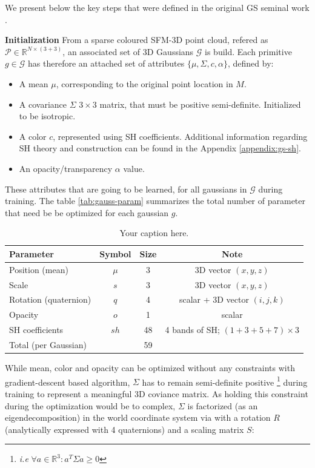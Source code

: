 We present below the key steps that were defined in the original \ac{GS} seminal work \citep{kerbl20233d}.

\noindent \textbf{Initialization} From a sparse coloured \ac{SFM}-3D point cloud, refered as $\mathcal{P}\in\mathbb{R}^{N\times(3+3)}$, an associated set of 3D Gaussians $\mathcal{G}$ is build. Each primitive $g \in \mathcal{G}$ has therefore an attached set of attributes $\{\mu,\Sigma,c,\alpha\}$, defined by: 
\begin{itemize}
    \item A mean $\mu$, corresponding to the original point location in $M$. 
    \item A covariance $\Sigma$ $3\times3$ matrix, that must be positive semi-definite. Initialized to be isotropic. 
    \item A color $c$, represented using \ac{SH} coefficients. Additional information regarding \ac{SH} theory and construction can be found in the Appendix \ref{appendix:gs-sh}. 
    \item An opacity/transparency $\alpha$ value. 
\end{itemize}

These attributes that are going to be learned, for all gaussians in  $\mathcal{G}$ during training. The table \ref{tab:gauss-param} summarizes the total number of parameter that need be be optimized for each gaussian $g$. 


\begin{table}[h!]
  \centering
  \begin{tabular}{lccc}
  \hline
  Parameter & Symbol & Size & Note \\
  \hline
  Position (mean) & $\mu$ & 3 & 3D vector $(x, y, z)$ \\
  Scale & $s$ & 3 & 3D vector $(x, y, z)$ \\
  Rotation (quaternion) & $q$ & 4 & scalar + 3D vector $(i, j, k)$ \\
  Opacity & $o$ & 1 & scalar \\
  SH coefficients & $sh$ & 48 & 4 bands of SH; $(1+3+5+7)\times3$ \\
  \hline
  Total (per Gaussian) & & 59 & \\
  \hline
  \end{tabular}
  \caption{Your caption here.}
  \label{table:your_label}
  \end{table}
  

While mean, color and opacity can be optimized without any constraints with gradient-descent based algorithm, $\Sigma$ has to remain semi-definite positive \footnote{\textit{i.e} $ \forall a \in \mathbb{R}^{3}: a^{T}\Sigma a \geq 0$} during training to represent a meaningful 3D coviance matrix. As holding this constraint during the optimization would be to complex, $\Sigma$ is factorized (as an eigendecomposition) in the world coordinate system via with a rotation $R$ (analytically expressed with 4 quaternions) and a scaling matrix $S$: 

